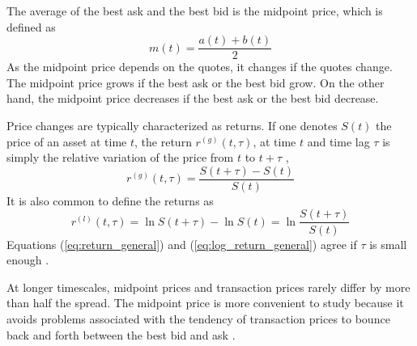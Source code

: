 The average of the best ask and the best bid is the midpoint price, which is
defined as
\cite{prop_order_book,subtle_nature,Bouchaud_2004,large_prices_changes,em_stylized_facts,stat_theory}
\begin{equation}\label{eq:midpoint_price}
    m\left(t\right)=\frac{a\left(t\right)+b\left(t\right)}{2}
\end{equation}
As the midpoint price depends on the quotes, it changes if the quotes change.
The midpoint price grows if the best ask or the best bid grow. On the other
hand, the midpoint price decreases if the best ask or the best bid
decrease.

Price changes are typically characterized as returns. If one denotes
$S\left( t\right)$ the price of an asset at time $t$, the return
$r^{\left(g\right)}\left(t, \tau\right)$, at time $t$ and time lag $\tau$ is
simply the relative variation of the price from $t$ to $t + \tau$
\cite{subtle_nature,empirical_facts,asynchrony_effects_corr,tick_size_impact,causes_epps_effect,non_stationarity},
\begin{equation}\label{eq:return_general}
    r^{\left(g\right)} \left(t, \tau \right) = \frac{S\left(t + \tau\right)
    - S\left(t\right)}{S\left(t\right)}
\end{equation}
It is also common to define the returns as
\cite{dissecting_cross,subtle_nature,empirical_facts,empirical_properties,large_prices_changes,pow_law_dist,theory_market_impact,spread_changes_affect,rand_mat,fluctions_market_friction}
\begin{equation}\label{eq:log_return_general}
    r^{\left(l\right)}\left(t,\tau\right) = \ln S\left(t + \tau\right)
    - \ln S\left(t\right) = \ln \frac{S\left(t + \tau\right)}{S\left(t\right)}
\end{equation}
Equations (\ref{eq:return_general}) and (\ref{eq:log_return_general}) agree if
$\tau$ is small enough \cite{subtle_nature,empirical_facts}.

At longer timescales, midpoint prices and transaction prices rarely differ by
more than half the spread. The midpoint price is more convenient to study
because it avoids problems associated with the tendency of transaction prices
to bounce back and forth between the best bid and ask
\cite{large_prices_changes}.

